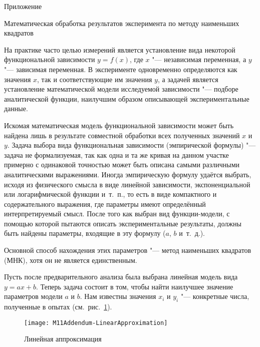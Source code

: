 \documentclass[a4paper, 12pt]{extarticle}
\begin{document}
\newpage
\begin{flushright}Приложение 
\end{flushright}
\begin{center}
Математическая обработка результатов эксперимента по методу наименьших квадратов %
\end{center}

На практике часто целью измерений является установление вида некоторой функциональной зависимости $y = f(x)$, где $x$ "--- независимая переменная, а $y$ "--- зависимая переменная. В эксперименте одновременно определяются как значения $x$, так и соответствующие им значения $y$, а задачей является установление математической модели исследуемой зависимости "--- подборе аналитической функции, наилучшим образом описывающей экспериментальные данные.

Искомая математическая модель функциональной зависимости может быть найдена лишь в результате совместной обработки всех полученных значений $x$ и $y$. Задача выбора вида функциональная зависимости (эмпирической формулы) "--- задача не формализуемая, так как одна и та же кривая на данном участке примерно с одинаковой точностью может быть описана самыми различными аналитическими выражениями. Иногда эмпирическую формулу удаётся выбрать, исходя из физического смысла в виде линейной зависимости, экспоненциальной или логарифмической функции и~т.~п., то есть в виде компактного и содержательного выражения, где параметры имеют определённый интерпретируемый смысл. После того как выбран вид функции-модели, с помощью которой пытаются описать экспериментальные результаты, должны быть найдены параметры, входящие в эту формулу ($a$, $b$ и~т.~д.). %

Основной способ нахождения этих параметров "--- метод наименьших квадратов (МНК), хотя он не является единственным. 

Пусть после предварительного анализа была выбрана линейная модель вида $y=ax + b$. Теперь задача состоит в том, чтобы найти наилучшее значение параметров модели $a$ и $b$. Нам известны значения $x_i$ и $y_i$ "--- конкретные числа, полученные в опытах (см.~рис.~\ref{fig:m11-linear-approx}). 

\begin{figure}[h]
\begin{center}
\texttt{[image: M11Addendum-LinearApproximation]}
\end{center}
\caption{Линейная аппроксимация \label{fig:m11-linear-approx}}
\end{figure}
\end{document}
